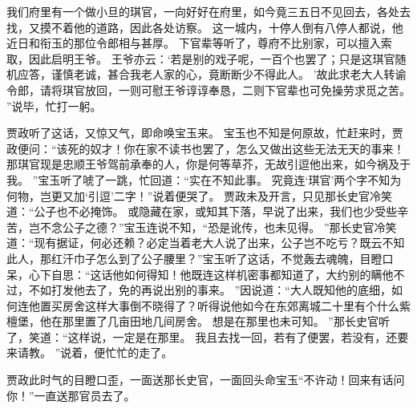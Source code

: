 我们府里有一个做小旦的琪官，一向好好在府里，如今竟三五日不见回去，各处去找，又摸不着他的道路，因此各处访察。
这一城内，十停人倒有八停人都说，他近日和衔玉的那位令郎相与甚厚。
下官辈等听了，尊府不比别家，可以擅入索取，因此启明王爷。
王爷亦云：‘若是别的戏子呢，一百个也罢了；只是这琪官随机应答，谨慎老诚，甚合我老人家的心，竟断断少不得此人。
’故此求老大人转谕令郎，请将琪官放回，一则可慰王爷谆谆奉恳，二则下官辈也可免操劳求觅之苦。
”说毕，忙打一躬。
\par
贾政听了这话，又惊又气，即命唤宝玉来。
宝玉也不知是何原故，忙赶来时，贾政便问：“该死的奴才！你在家不读书也罢了，怎么又做出这些无法无天的事来！那琪官现是忠顺王爷驾前承奉的人，你是何等草芥，无故引逗他出来，如今祸及于我。
”宝玉听了唬了一跳，忙回道：“实在不知此事。
究竟连‘琪官’两个字不知为何物，岂更又加‘引逗’二字！”说着便哭了。
贾政未及开言，只见那长史官冷笑道：“公子也不必掩饰。
或隐藏在家，或知其下落，早说了出来，我们也少受些辛苦，岂不念公子之德？”宝玉连说不知，“恐是讹传，也未见得。
”那长史官冷笑道：“现有据证，何必还赖？必定当着老大人说了出来，公子岂不吃亏？既云不知此人，那红汗巾子怎么到了公子腰里？”宝玉听了这话，不觉轰去魂魄，目瞪口呆，心下自思：“这话他如何得知！他既连这样机密事都知道了，大约别的瞒他不过，不如打发他去了，免的再说出别的事来。
”因说道：“大人既知他的底细，如何连他置买房舍这样大事倒不晓得了？听得说他如今在东郊离城二十里有个什么紫檀堡，他在那里置了几亩田地几间房舍。
想是在那里也未可知。
”那长史官听了，笑道：“这样说，一定是在那里。
我且去找一回，若有了便罢，若没有，还要来请教。
”说着，便忙忙的走了。
\par
贾政此时气的目瞪口歪，一面送那长史官，一面回头命宝玉“不许动！回来有话问你！”一直送那官员去了。
